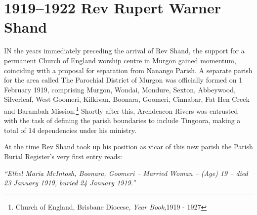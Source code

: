 \newpage


\balance


\printendnotes[custom]
\setcounter{endnote}{0}




\chapter{1919--1922 Rev Rupert Warner Shand}
\nobalance


\lettrine[lines=3]{I}{N}
 the years immediately preceding the arrival of Rev Shand, the support for a permanent Church of England worship centre in Murgon gained momentum, coinciding with a proposal for separation from Nanango Parish. A separate parish for the area called The Parochial District of Murgon was officially formed on 1 February 1919, comprising Murgon, Wondai, Mondure, Sexton, Abbeywood, Silverleaf, West Goomeri, Kilkivan, Boonara, Goomeri, Cinnabar, Fat Hen Creek and Barambah Mission.\footnote{Church of England, Brisbane Diocese, \emph{Year Book,}1919 - 1927} Shortly after this, Archdeacon Rivers was entrusted with the task of defining the parish boundaries to include Tingoora, making a total of 14 dependencies under his ministry.

At the time Rev Shand took up his position as vicar of this new parish the Parish Burial Register's very first entry reads:



\medskip


\emph{``Ethel Maria McIntosh, Boonara, Goomeri -- Married Woman -- (Age) 19 -- died 23 January 1919, buried 24 January 1919.''}



\medskip








